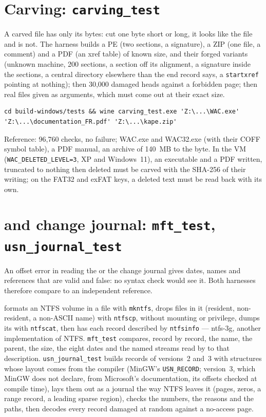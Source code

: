 \documentclass[11pt,a4paper,oneside]{report}
\begin{document}
\section{Carving: \texttt{carving\_test}}

A carved file has only its bytes: cut one byte short or long, it looks like
the file and is not. The harness builds a PE (two sections, a signature), a
ZIP (one file, a comment) and a PDF (an xref table) of known size, and their
forged variants (unknown machine, 200 sections, a section off its alignment,
a signature inside the sections, a central directory elsewhere than the end
record says, a \texttt{startxref} pointing at nothing); then 30,000 damaged
heads against a forbidden page; then real files given as arguments, which
must come out at their exact size.

\begin{lstlisting}
cd build-windows/tests && wine carving_test.exe 'Z:\...\WAC.exe' 'Z:\...\documentation_FR.pdf' 'Z:\...\kape.zip'
\end{lstlisting}

Reference: 96,760 checks, no failure; WAC.exe and WAC32.exe (with their COFF
symbol table), a PDF manual, an archive of 140~MB to the byte. In the VM
(\texttt{WAC\_DELETED\_LEVEL=3}, XP and Windows~11), an executable and a PDF
written, truncated to nothing then deleted must be carved with the SHA-256 of
their writing; on the FAT32 and exFAT keys, a deleted text must be read back
with its own.

\section{ and change journal: \texttt{mft\_test}, \texttt{usn\_journal\_test}}

An offset error in reading the  or the change journal gives
dates, names and references that are valid and false: no syntax check would
see it. Both harnesses therefore compare \wac{} to an independent reference.

 formats an NTFS volume in a file with
\texttt{mkntfs}, drops files in it (resident, non-resident, a non-ASCII name)
with \texttt{ntfscp}, without mounting or privilege, dumps its
 with \texttt{ntfscat}, then has each record described by
\texttt{ntfsinfo} — ntfs-3g, another implementation of NTFS.
\texttt{mft\_test} compares, record by record, the name, the parent, the
size, the eight dates and the named streams read by \wac{} to that
description. \texttt{usn\_journal\_test} builds records of versions~2 and~3
with structures whose layout comes from the compiler (MinGW's
\texttt{USN\_RECORD}; version~3, which MinGW does not declare, from
Microsoft's documentation, its offsets checked at compile time), lays them out
as a journal the way NTFS leaves it (pages, zeros, a range record, a leading
sparse region), checks the numbers, the reasons and the paths, then decodes
every record damaged at random against a no-access page.
\end{document}

